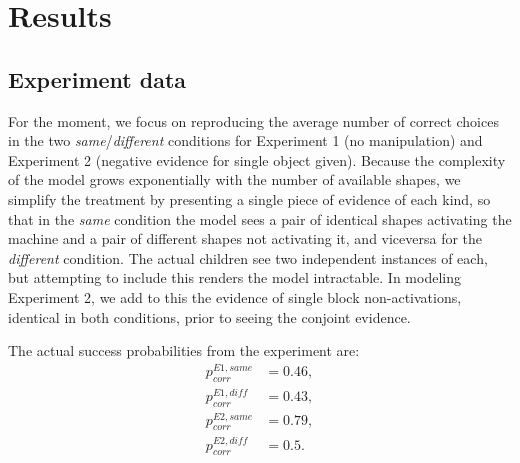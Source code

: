 \documentclass[11pt, a4paper]{article}
\begin{document}
\section*{Results}
\subsection*{Experiment data}
For the moment, we focus on reproducing the average number of correct choices in the two \emph{same}/\emph{different} conditions for Experiment 1 (no manipulation) and Experiment 2 (negative evidence for single object given). Because the complexity of the model grows exponentially with the number of available shapes, we simplify the treatment by presenting a single piece of evidence of each kind, so that in the \emph{same} condition the model sees a pair of identical shapes activating the machine and a pair of different shapes not activating it, and viceversa for the \emph{different} condition. The actual children see two independent instances of each, but attempting to include this renders the model intractable. In modeling Experiment 2, we add to this the evidence of single block non-activations, identical in both conditions, prior to seeing the conjoint evidence.

The actual success probabilities from the experiment are:
\begin{equation}
\begin{split}
p^{E1,same}_{corr}&=0.46,\\
p^{E1,diff}_{corr}&=0.43,\\
p^{E2,same}_{corr}&=0.79,\\
p^{E2,diff}_{corr}&=0.5.
\end{split}
\end{equation}
\end{document}
